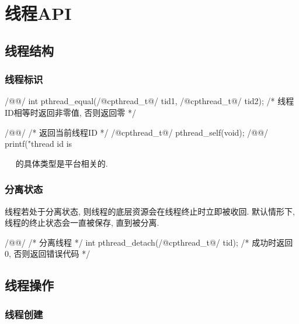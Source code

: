 \documentclass[hidelinks]{ctexart}
\newcommand{\mcode}[1]{\ \mylib{#1} \ }
\begin{document}

\section{线程API} %
\label{sec:线程api}

\subsection{线程结构} %
\label{sub:线程结构}

\subsubsection{线程标识} %
\label{ssub:线程标识}

\begin{clst}
/@@/
int pthread_equal(/@\+c{pthread\_t}@/ tid1, /@\+c{pthread\_t}@/ tid2);
/* 线程ID相等时返回非零值, 否则返回零 */
\end{clst}

\begin{clst}
/@@/
/* 返回当前线程ID */
/@\+c{pthread\_t}@/ pthread_self(void);
/@\lhend @/
printf("thread id is %
\end{clst}

\mcode{pthread\_t}的具体类型是平台相关的.


\subsubsection{分离状态} %
\label{ssub:分离状态}

线程若处于分离状态, 则线程的底层资源会在线程终止时立即被收回. 默认情形下, 线程的终止状态会一直被保存, 直到被分离.

\begin{clst}
/@@/
/* 分离线程 */
int pthread_detach(/@\+c{pthread\_t}@/ tid);
/* 成功时返回0, 否则返回错误代码 */
\end{clst}


\subsection{线程操作} %
\label{sub:线程操作}

\subsubsection{线程创建} %
\label{ssub:线程创建}
\end{document}
